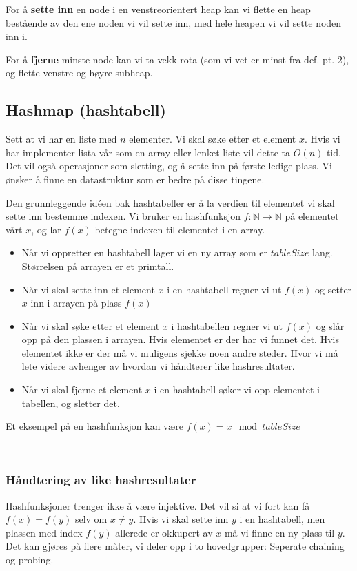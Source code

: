 For å \textbf{sette inn} en node i en venstreorientert heap kan vi flette en heap bestående av den ene noden vi vil sette inn, med hele heapen vi vil sette noden inn i.

For å \textbf{fjerne} minste node kan vi ta vekk rota (som vi vet er minst fra def. pt. 2), og flette venstre og høyre subheap.





\subsection{Hashmap (hashtabell)} \label{hashmap}
Sett at vi har en liste med $ n $ elementer. Vi skal søke etter et element $ x $. Hvis vi har implementer lista vår som en array eller lenket liste vil dette ta $ O(n) $ tid. Det vil også operasjoner som sletting, og å sette inn på første ledige plass. Vi ønsker å finne en datastruktur som er bedre på disse tingene. 

Den grunnleggende idéen bak hashtabeller er å la verdien til elementet vi skal sette inn bestemme indexen. Vi bruker en hashfunksjon $ f:\mathbb{N}\rightarrow\mathbb{N} $ på elementet vårt $ x $, og lar $ f(x) $ betegne indexen til elementet i en array. 

\begin{itemize}
\item Når vi oppretter en hashtabell lager vi en ny array som er $ tableSize $ lang. Størrelsen på arrayen er et primtall. 
\item Når vi skal sette inn et element $ x $ i en hashtabell regner vi ut $ f(x) $ og setter $ x $ inn i arrayen på plass $ f(x) $
\item Når vi skal søke etter et element $ x $ i hashtabellen regner vi ut $ f(x) $ og slår opp på den plassen i arrayen. Hvis elementet er der har vi funnet det. Hvis elementet ikke er der må vi muligens sjekke noen andre steder. Hvor vi må lete videre avhenger av hvordan vi håndterer like hashresultater. 
\item Når vi skal fjerne et element $ x $ i en hashtabell søker vi opp elementet i tabellen, og sletter det. 
\end{itemize}

\noindent Et eksempel på en hashfunksjon kan være $ f(x) = x \mod tableSize $

~\\
\subsubsection{Håndtering av like hashresultater}
Hashfunksjoner trenger ikke å være injektive. Det vil si at vi fort kan få $ f(x) = f(y) $ selv om $ x \neq y $. Hvis vi skal sette inn $ y $ i en hashtabell, men plassen med index $ f(y) $ allerede er okkupert av $ x $ må vi finne en ny plass til $ y $. Det kan gjøres på flere måter, vi deler opp i to hovedgrupper: Seperate chaining og probing. 


